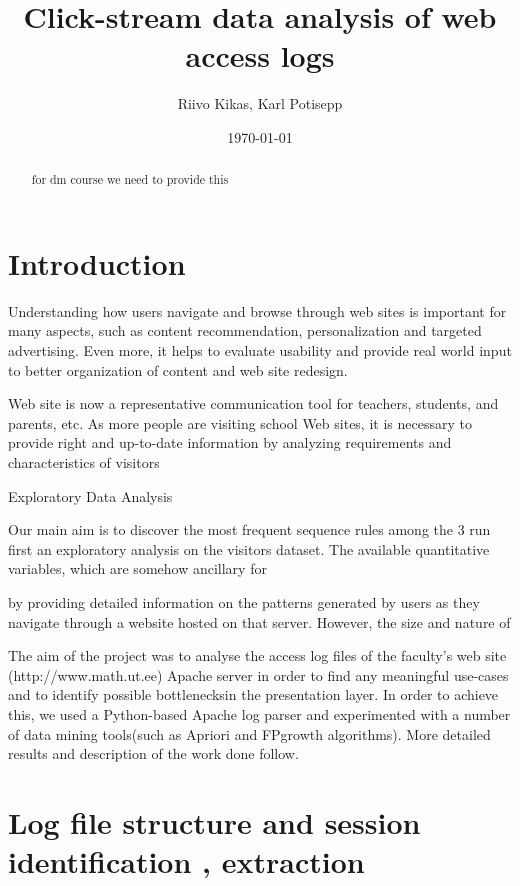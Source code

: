 \documentclass[english,12pt,a4paper]{article}
\begin{document}
\title{Click-stream data analysis of web access logs}
\author{Riivo Kikas, Karl Potisepp}
\date{\today}
\maketitle

\begin{abstract}
for dm course we need to provide this

\end{abstract}

\section{Introduction}
Understanding how users navigate and browse through web sites is important for many aspects, such as content recommendation, personalization and targeted advertising. Even more, it helps to evaluate usability and provide real world input to better organization of content and web site redesign. 

Web site is now a representative
communication tool for teachers, students, and parents, etc. As
more people are visiting school Web sites, it is necessary to
provide right and up-to-date information by analyzing
requirements and characteristics of visitors

Exploratory Data Analysis


Our main aim is to discover the most frequent sequence rules among the 3
run first an exploratory analysis on the
visitors dataset. The available quantitative variables, which are somehow ancillary for

by providing detailed information on the patterns generated by users as they
navigate through a website hosted on that server. However, the size and nature of



The aim of the project was to analyse the access log files of the faculty's web site (http://www.math.ut.ee) Apache server in order to find any meaningful use-cases and to identify possible bottlenecksin the presentation layer. In order to achieve this, we used a Python-based Apache log parser and experimented with a number of data mining tools(such as Apriori and FPgrowth algorithms). More detailed results and description of the work done follow.






\section{Log file structure and session identification , extraction}
\end{document}
